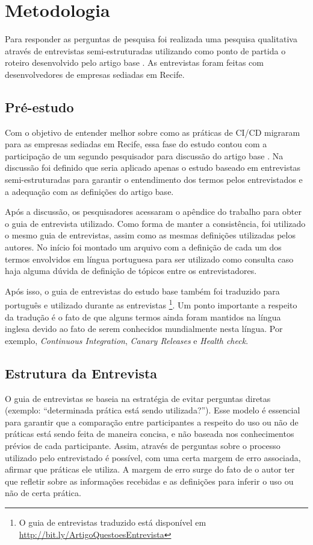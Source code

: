 
\section{Metodologia}

Para responder as perguntas de pesquisa foi realizada uma pesquisa qualitativa através de entrevistas semi-estruturadas utilizando como ponto de partida o roteiro desenvolvido pelo artigo base \cite{empiricalStudy2016}. As entrevistas foram feitas com desenvolvedores de empresas sediadas em Recife.


\subsection{Pré-estudo}

Com o objetivo de entender melhor sobre como as práticas de CI/CD migraram para as empresas sediadas em Recife, essa fase do estudo contou com a participação de um segundo pesquisador para discussão do artigo base \cite{empiricalStudy2016}. Na discussão foi definido que seria aplicado apenas o estudo baseado em entrevistas semi-estruturadas para garantir o entendimento dos termos pelos entrevistados e a adequação com as definições do artigo base. 

Após a discussão, os pesquisadores acessaram o apêndice do trabalho para obter o guia de entrevista utilizado. Como forma de manter a consistência, foi utilizado o mesmo guia de entrevistas, assim como as mesmas definições utilizadas pelos autores. No início foi montado um arquivo com a definição de cada um dos termos envolvidos em língua portuguesa para ser utilizado como consulta caso haja alguma dúvida de definição de tópicos entre os entrevistadores.

Após isso, o guia de entrevistas do estudo base também foi traduzido para português e utilizado durante as entrevistas \footnote{O guia de entrevistas traduzido está disponível em \url{http://bit.ly/ArtigoQuestoesEntrevista}}. Um ponto importante a respeito da tradução é o fato de que alguns termos ainda foram mantidos na língua inglesa devido ao fato de serem conhecidos mundialmente nesta língua. Por exemplo, \emph{Continuous Integration}, \emph{Canary Releases} e \emph{Health check}.


\subsection{Estrutura da Entrevista}

O guia de entrevistas se baseia na estratégia de evitar perguntas diretas (exemplo: “determinada prática está sendo utilizada?”). Esse modelo é essencial para garantir que a comparação entre participantes a respeito do uso ou não de práticas está sendo feita de maneira concisa, e não baseada nos conhecimentos prévios de cada participante. Assim, através de perguntas sobre o processo utilizado pelo entrevistado é possível, com uma certa margem de erro associada, afirmar que práticas ele utiliza. A margem de erro surge do fato de o autor ter que refletir sobre as informações recebidas e as definições para inferir o uso ou não de certa prática.

